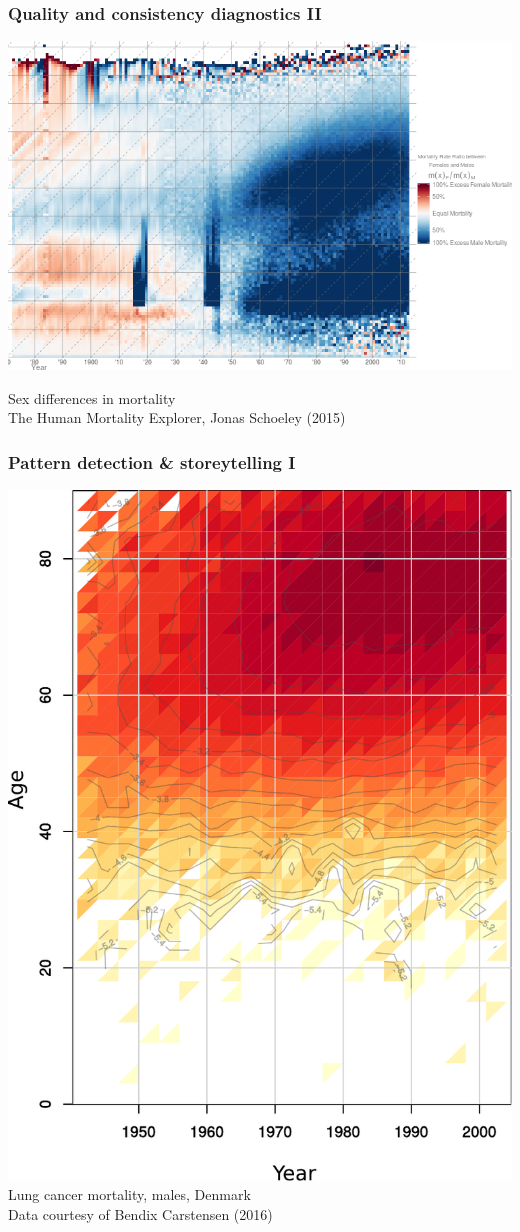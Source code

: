 \documentclass[20pt]{beamer}
\begin{document}
\begin{frame}
\frametitle{Quality and consistency diagnostics II}
\begin{center}
\includegraphics[scale=.8]{Figures/Schoeley2.png}
\end{center}
Sex differences in mortality\\The Human Mortality Explorer, Jonas Schoeley
(2015)
\end{frame}

\begin{frame}
\frametitle{Pattern detection \& storeytelling I}
\includegraphics[scale=.7]{Figures/LungCancerDenmark.pdf}\\
Lung cancer mortality, males, Denmark\\
Data courtesy of Bendix Carstensen (2016)
\end{frame}
\end{document}
